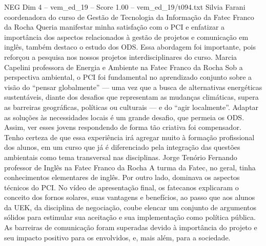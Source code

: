 \begin{textsample}{NEG Dim 4 – vem\_ed\_19 – Score 1.00 – vem\_ed\_19/t094.txt}  \label{ex:f4_neg_055}
Silvia Farani coordenadora do curso de Gestão de Tecnologia da Informação da Fatec Franco da Rocha Queria manifestar minha satisfação com o PCI e enfatizar a importância dos aspectos relacionados à gestão de projetos e comunicação em inglês, também destaco o estudo dos ODS.
Essa abordagem foi importante, pois reforçou a pesquisa nos nossos projetos interdisciplinares do curso.
Marcia Capelini professora de Energia e Ambiente na Fatec Franco da Rocha Sob a perspectiva ambiental, o PCI foi fundamental no aprendizado conjunto sobre a visão do “pensar globalmente” — uma vez que a busca de alternativas energéticas sustentáveis, diante dos desafios que representam as mudanças climáticas, supera as barreiras geográficas, políticas ou culturais — e do “agir localmente”.
Adaptar as soluções às necessidades locais é um grande desafio, que permeia os ODS.
Assim, ver esses jovens respondendo de forma tão criativa foi compensador.
Tenho certeza de que essa experiência irá agregar muito à formação profissional dos alunos, em um curso que já é diferenciado pela integração das questões ambientais como tema transversal nas disciplinas.
Jorge Tenório Fernando professor de Inglês na Fatec Franco da Rocha A turma da Fatec, no geral, tinha conhecimentos elementares de inglês.
Por outro lado, dominava os aspectos técnicos do PCI.
No vídeo de apresentação final, os fatecanos explicaram o conceito dos fornos solares, suas vantagens e benefícios, ao passo que aos alunos da UEK, da disciplina de negociação, coube elencar um conjunto de argumentos sólidos para estimular sua aceitação e sua implementação como política pública.
As barreiras de comunicação foram superadas devido à importância do projeto e seu impacto positivo para os envolvidos, e, mais além, para a sociedade.

\end{textsample}
